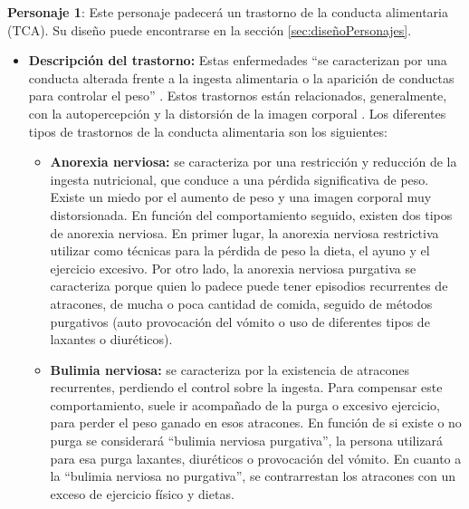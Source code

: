 \documentclass[12pt, a4paper,twoside,titlepage]{book}
\begin{document}
\textbf{Personaje 1}: Este personaje padecerá un trastorno de la conducta alimentaria (TCA). Su diseño puede encontrarse en la sección \ref{sec:diseñoPersonajes}.

\begin{itemize}
    \item {\textbf{Descripción del trastorno:}   Estas enfermedades ``se caracterizan por una conducta alterada frente a la ingesta alimentaria o la aparición de conductas para controlar el peso'' \cite{tcasdescripcion}. Estos trastornos están relacionados, generalmente, con la autopercepción y la distorsión de la imagen corporal \cite{tcaCM}. Los diferentes tipos de trastornos de la conducta alimentaria son los siguientes: 
        \begin{itemize}
            \item {\textbf{Anorexia nerviosa:} se caracteriza por una restricción y reducción de la ingesta nutricional, que conduce a una pérdida significativa de peso. Existe un miedo por el aumento de peso y una imagen corporal muy distorsionada. En función del comportamiento seguido, existen dos tipos de anorexia nerviosa. En primer lugar, la anorexia nerviosa restrictiva utilizar como técnicas para la pérdida de peso la dieta, el ayuno y el ejercicio excesivo. Por otro lado, la anorexia nerviosa purgativa se caracteriza porque quien lo padece puede tener episodios recurrentes de atracones, de mucha o poca cantidad de comida, seguido de métodos purgativos (auto provocación del vómito o uso de diferentes tipos de laxantes o diuréticos). }
            \item {\textbf{Bulimia nerviosa:} se caracteriza por la existencia de atracones recurrentes, perdiendo el control sobre la ingesta. Para compensar este comportamiento, suele ir acompañado de la purga o excesivo ejercicio, para perder el peso ganado en esos atracones. En función de si existe o no purga se considerará ``bulimia nerviosa purgativa'', la persona utilizará para esa purga laxantes, diuréticos o provocación del vómito. En cuanto a la “bulimia nerviosa no purgativa”, se contrarrestan los atracones con un exceso de ejercicio físico y dietas.  }
            

\end{itemize}}
\end{itemize}
\end{document}
